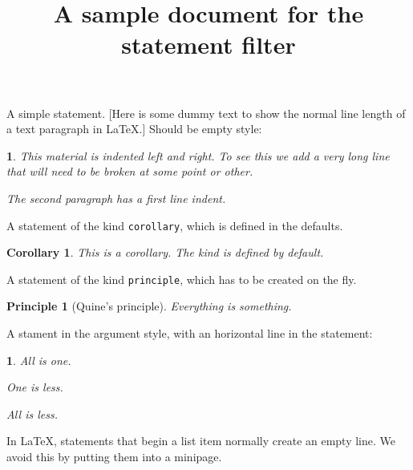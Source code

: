 \documentclass[
]{article}
\title{A sample document for the statement filter}
\author{}
\date{}
\theoremstyle{empty}
\newtheorem{statement}{}
\theoremstyle{plain}
\newtheorem{corollary}{Corollary}
\theoremstyle{plain}
\newtheorem{principle}{Principle}
\theoremstyle{emptynoindent}
\newtheorem{argument}{}
\begin{document}
\maketitle

A simple statement. {[}Here is some dummy text to show the normal line
length of a text paragraph in LaTeX.{]} Should be empty style:

\begin{statement}

This material is indented left and right. To see this we add a very long
line that will need to be broken at some point or other.

The second paragraph has a first line indent.

\end{statement}

A statement of the kind \texttt{corollary}, which is defined in the
defaults.

\begin{corollary}

This is a corollary. The kind is defined by default.

\end{corollary}

A statement of the kind \texttt{principle}, which has to be created on
the fly.

\begin{principle}[Quine’s principle]

Everything is something.

\end{principle}

A stament in the argument style, with an horizontal line in the
statement:

\begin{argument}

All is one.

One is less.

\nopagebreak[4]\raisebox{.25\baselineskip}{\rule{0.5\linewidth}{0.5pt}}\nopagebreak[4]

All is less.

\end{argument}

In LaTeX, statements that begin a list item normally create an empty
line. We avoid this by putting them into a minipage.

\edef\docparindent{\the\parindent}
\end{document}
